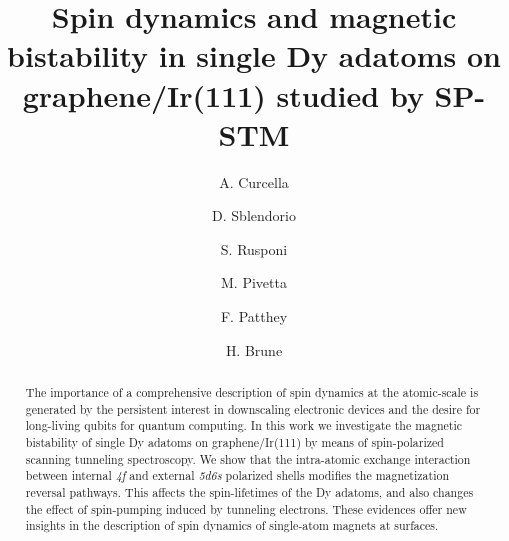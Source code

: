 \documentclass[
reprint,amsmath,amssymb,aps]{revtex4-2}
\begin{document}

\title{Spin dynamics and magnetic bistability in single Dy adatoms on graphene/Ir(111)
studied by SP-STM}

\author{A. Curcella}

\author{D. Sblendorio}

\author{S. Rusponi}

\author{M. Pivetta}

\author{F. Patthey}

\author{H. Brune}
 

\begin{abstract}
The importance of a comprehensive description of spin dynamics at the atomic-scale is generated by the persistent interest in downscaling electronic devices and the desire for long-living qubits for quantum computing. In this work we investigate the magnetic bistability of single Dy adatoms on graphene/Ir(111) by means of spin-polarized scanning tunneling spectroscopy. We show that the intra-atomic exchange interaction between internal \textit{4f} and external \textit{5d6s} polarized shells modifies the magnetization reversal pathways. This affects the spin-lifetimes of the Dy adatoms, and also changes the effect of spin-pumping induced by tunneling electrons. These evidences offer new insights in the description of spin dynamics of single-atom magnets at surfaces. 
\end{abstract}

\maketitle
\end{document}
